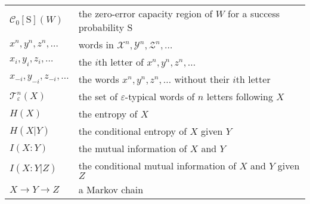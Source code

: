 \begin{longtable}{ll}
  $\mathcal{C}_0[\mathrm{S}](W)$ & the zero-error capacity region of $W$ for a success probability $\mathrm{S}$\\
  $x^n,y^n,z^n,\ldots$ & words in $\mathcal{X}^n,\mathcal{Y}^n,\mathcal{Z}^n,\ldots$\\
  $x_i,y_i,z_i,\ldots$ & the $i$th letter of $x^n,y^n,z^n,\ldots$\\
  $x_{-i},y_{-i},z_{-i},\ldots$ & the words $x^n,y^n,z^n,\ldots$ without their $i$th letter\\
  $\mathcal{T}^n_{\varepsilon}(X)$ & the set of $\varepsilon$-typical words of $n$ letters following $X$\\
  $H(X)$ & the entropy of $X$\\
  $H(X|Y)$ & the conditional entropy of $X$ given $Y$\\
  $I(X:Y)$ & the mutual information of $X$ and $Y$\\
  $I(X:Y|Z)$ & the conditional mutual information of $X$ and $Y$ given $Z$\\
  $X \rightarrow Y \rightarrow Z$ & a Markov chain\\ 
\end{longtable}
